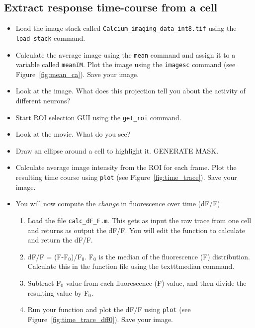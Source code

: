 \documentclass[paper=a4, fontsize=11pt]{scrartcl} %
\numberwithin{equation}{section} %
\numberwithin{figure}{section} %
\numberwithin{table}{section} %
\newcommand{\sub}[1]{\ensuremath{_{#1}}}
\begin{document}
\subsection{Extract response time-course from a cell}
\begin{itemize}
\setlength{\parskip}{0.25em}
\item Load the image stack called \texttt{Calcium\_imaging\_data\_int8.tif} using the \texttt{load\_stack} command.
\item Calculate the average image using the \texttt{mean} command and assign it to a variable called \texttt{meanIM}.  Plot the image using the \texttt{imagesc} command (see Figure~\ref{fig:mean_ca}). Save your image.
\item Look at the image. What does this projection tell you about the activity of different neurons?
\item Start ROI selection GUI using the \texttt{get_roi} command.
\item Look at the movie. What do you see?
\item Draw an ellipse around a cell to highlight it. GENERATE MASK.
\item Calculate average image intensity from the ROI for each frame. Plot the resulting time course using \texttt{plot} (see Figure~\ref{fig:time_trace}). Save your image.
\item You will now compute the \textit{change} in fluorescence over time (dF/F)
	\begin{enumerate}
	\item Load the file  \texttt{calc\_dF\_F.m}. This gets as input the raw trace from one cell and returns as output the dF/F. You will edit
	the function to calculate and return the dF/F.
	\item dF/F = (F-F\sub{0})/F\sub{0}. F\sub{0} is the median of the fluorescence (F) distribution. Calculate this in the function file using the texttt{median} command.
	\item Subtract F\sub{0} value from each fluorescence (F) value, and then divide the resulting value by F\sub{0}. 	
	\item Run your function and plot the dF/F using \texttt{plot} (see Figure~\ref{fig:time_trace_dff0}). Save your image.
	\end{enumerate}
\end{itemize}
\end{document}
